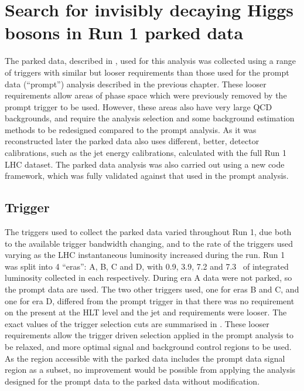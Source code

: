 \chapter{Search for invisibly decaying Higgs bosons in Run 1 parked data}
\label{chap:parked}
The parked data, described in , used for this analysis was collected using a range of triggers with similar but looser requirements than those used for the prompt data (``prompt'') analysis described in the previous chapter. These looser requirements allow areas of phase space which were previously removed by the prompt trigger to be used. However, these areas also have very large \ac{QCD} backgrounds, and require the analysis selection 
and some background estimation methods to be redesigned compared to the prompt analysis. As it was reconstructed later the parked data also uses different, better, detector calibrations, such as the jet energy calibrations, calculated with the full Run 1 LHC dataset. The parked data analysis was also carried out using a new code framework, which was fully validated against that used in the prompt analysis. %


\section{Trigger}
\label{sec:parkedtrigger}
The triggers used to collect the parked data varied throughout Run 1, due both to the available trigger bandwidth changing, and to the rate of the triggers used varying as the LHC instantaneous luminosity increased during the run. Run 1 was split into 4 ``eras'': A, B, C and D, with 0.9, 3.9, 7.2 and 7.3 \invfb\, of integrated luminosity collected in each respectively. During era A data were not parked, so the prompt data are used. The two other triggers used, one for eras B and C, and one for era D, differed from the prompt trigger in that there was no requirement on the \MET present at the \ac{HLT} level and the jet \pt and \Mjj requirements were looser. The exact values of the trigger selection cuts are summarised in . These looser requirements allow the trigger driven selection applied in the prompt analysis to be relaxed, and more optimal signal and background control regions to be used. As the region accessible with the parked data includes the prompt data signal region as a subset, no improvement would be possible from applying the analysis designed for the prompt data to the parked data without modification. 

